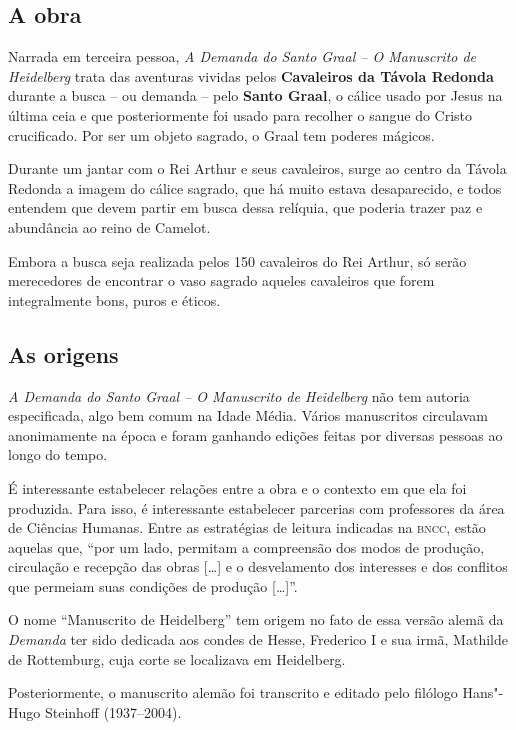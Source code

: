 \documentclass{extarticle}
\begin{document}
\subsection{A obra}

Narrada em terceira pessoa, \emph{A Demanda do Santo Graal -- O
Manuscrito de Heidelberg} trata das aventuras vividas pelos
\textbf{Cavaleiros da Távola Redonda} durante a busca -- ou demanda --
pelo \textbf{Santo Graal}, o cálice usado por Jesus na última ceia e que
posteriormente foi usado para recolher o sangue do Cristo crucificado.
Por ser um objeto sagrado, o Graal tem poderes mágicos.

Durante um jantar com o Rei Arthur e seus cavaleiros, surge ao centro da
Távola Redonda a imagem do cálice sagrado, que há muito estava
desaparecido, e todos entendem que devem partir em busca dessa relíquia,
que poderia trazer paz e abundância ao reino de Camelot.

Embora a busca seja realizada pelos 150 cavaleiros do Rei Arthur, só
serão merecedores de encontrar o vaso sagrado aqueles cavaleiros que
forem integralmente bons, puros e éticos.

\subsection{As origens}

\emph{A Demanda do Santo Graal -- O Manuscrito de Heidelberg} não tem
autoria especificada, algo bem comum na Idade Média. Vários manuscritos
circulavam anonimamente na época e foram ganhando edições feitas por
diversas pessoas ao longo do tempo.

É interessante estabelecer relações entre a obra e o contexto em que ela
foi produzida. Para isso, é interessante estabelecer parcerias com
professores da área de Ciências Humanas. Entre as estratégias de leitura
indicadas na \textsc{bncc}, estão aquelas que, ``por um lado, permitam a
compreensão dos modos de produção, circulação e recepção das obras
{[}\ldots{}{]} e o desvelamento dos interesses e dos conflitos que permeiam
suas condições de produção {[}\ldots{}{]}''.

O nome ``Manuscrito de Heidelberg'' tem origem no fato de essa versão
alemã da \emph{Demanda} ter sido dedicada aos condes de Hesse, Frederico
I e sua irmã, Mathilde de Rottemburg, cuja corte se localizava em
Heidelberg.

Posteriormente, o manuscrito alemão foi transcrito e editado pelo
filólogo Hans"-Hugo Steinhoff (1937--2004).
\end{document}
